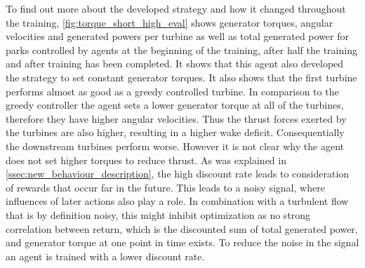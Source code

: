 To find out more about the developed strategy and how it changed throughout the training, \autoref{fig:torque_short_high_eval} shows generator torques, angular velocities and generated powers per turbine as well as total generated power for parks controlled by agents at the beginning of the training, after half the training and after training has been completed. It shows that this agent also developed the strategy to set constant generator torques.  It also  shows that the first turbine performs almost as good as a greedy controlled turbine. In comparison to the greedy controller the agent sets a lower generator torque at all of the turbines, therefore they have higher angular velocities. Thus the thrust forces exerted by the turbines are also higher, resulting in a higher wake deficit. Consequentially the downstream turbines perform worse. However it is not clear why the agent does not set higher torques to reduce thrust. As was explained in \autoref{ssec:new_behaviour_description}, the high discount rate leads to consideration of rewards that occur far in the future. This leads to a noisy signal, where influences of later actions also play a role. In combination with a turbulent flow that is by definition noisy, this might inhibit optimization as no strong correlation between return, which is the discounted sum of total generated power, and generator torque at one point in time exists. To reduce the noise in the signal an agent is trained with a lower discount rate. \newpage
